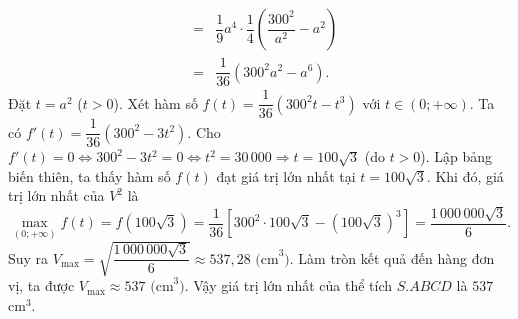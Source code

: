 \begin{ex}
{\begin{eqnarray*}
			&=& \dfrac{1}{9}a^4 \cdot \dfrac{1}{4}\left(\dfrac{300^2}{a^2} - a^2\right) \\
			&=& \dfrac{1}{36}\left(300^2a^2 - a^6\right).
		\end{eqnarray*}
		Đặt $t = a^2$ ($t > 0$). Xét hàm số $f(t) = \dfrac{1}{36}\left(300^2t - t^3\right)$ với $t \in (0; +\infty)$.
		Ta có $f'(t) = \dfrac{1}{36}\left(300^2 - 3t^2\right)$.
		Cho $f'(t) = 0 \Leftrightarrow 300^2 - 3t^2 = 0 \Leftrightarrow t^2 = 30\,000 \Rightarrow t = 100\sqrt{3}$ (do $t > 0$).
		Lập bảng biến thiên, ta thấy hàm số $f(t)$ đạt giá trị lớn nhất tại $t = 100\sqrt{3}$.
		Khi đó, giá trị lớn nhất của $V^2$ là
		\[ \max\limits_{(0;+\infty)} f(t) = f\left(100\sqrt{3}\right) = \dfrac{1}{36}\left[300^2 \cdot 100\sqrt{3} - \left(100\sqrt{3}\right)^3\right] = \dfrac{1\,000\,000\sqrt{3}}{6}. \]
		Suy ra $V_{\max} = \sqrt{\dfrac{1\,000\,000\sqrt{3}}{6}} \approx 537{,}28\text{ (cm}^3\text{)}$.
		Làm tròn kết quả đến hàng đơn vị, ta được $V_{\max} \approx 537\text{ (cm}^3\text{)}$.
		Vậy giá trị lớn nhất của thể tích $S. ABCD$ là $537$\,cm$^3$.
	}
\end{ex}

